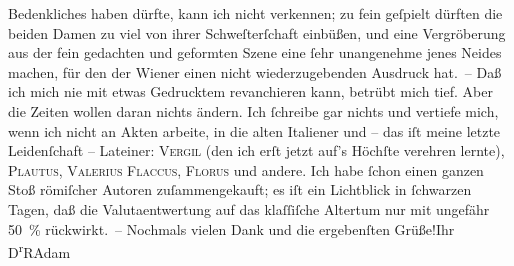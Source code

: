 \begin{ledgroupsized}[t]{13cm}
                  Bedenk{\pb}liches haben dürfte, kann ich
               nicht verkennen; zu fein geſpielt dürften die beiden Damen zu viel von ihrer
               Schweſterſchaft einbüßen, und eine Vergröberung aus der fein gedachten und geformten
               Szene eine ſehr unangenehme jenes Neides machen, für den der Wiener einen nicht wiederzugebenden Ausdruck hat. –\pend
           \pstart
           Daß ich mich nie mit etwas Gedrucktem revanchieren kann, betrübt mich tief. Aber die
               Zeiten wollen daran nichts ändern. Ich ſchreibe gar nichts und vertiefe mich, wenn
               ich nicht an Akten arbeite, in die alten Italiener und – das iſt meine letzte Leidenſchaft – Lateiner: \textsc{Vergil} (den ich erſt jetzt auf's Höchſte verehren lernte), \textsc{Plautus}, \textsc{Valerius Flaccus}, \textsc{Florus} und andere. Ich habe ſchon einen ganzen Stoß römiſcher Autoren zuſammengekauft;
               es iſt ein Lichtblick in ſchwarzen Tagen, daß die Valutaentwertung auf das klaſſiſche
               Altertum nur mit ungefähr 50 {\%} rückwirkt. –\pend
           \pstart
           Nochmals vielen Dank und die ergebenſten Grüße!\hspace*{3.5em}Ihr\pend
           \pstart \spacefill\mbox{D\textsuperscript{r}RAdam}\pend{}
         
         \endnumbering{}\end{ledgroupsized}  \newcommand{\dateiname}{L02335}\newcommand{\titel}{Robert Adam an Arthur Schnitzler, 13. 2. 1920}\newcommand{\editorInnen}{Martin Anton Müller und Gerd-Hermann Susen}
      